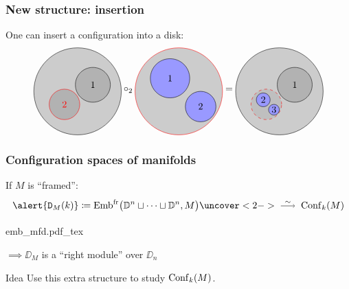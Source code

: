 \documentclass{beamer}
\newcommand{\inklude}[2]{
  \begin{center}
    \def\svgwidth{#1\linewidth} {#2.pdf_tex}
  \end{center}
}
\begin{document}
\begin{frame}
  \frametitle{New structure: insertion}
  One can insert a configuration into a disk:
    \[
      \begin{tikzpicture}[scale=0.8, baseline]
        \filldraw[fill=gray!40] (0,0) circle (2);
        \filldraw[fill=gray!60] (0.7,0.3) circle (0.8) node {$1$};
        \filldraw[red,fill=gray!60] (-0.6,-0.6) circle (0.7) node{$2$};
      \end{tikzpicture}
      \circ_{2}
      \begin{tikzpicture}[scale=0.8, baseline]
        \filldraw[red,fill=gray!40] (0,0) circle (2);
        \filldraw[fill=blue!40] (-0.4,0.6) circle (0.9) node{$1$};
        \filldraw[fill=blue!40] (1, -0.7) circle (0.7) node{$2$};
      \end{tikzpicture}
      =
      \begin{tikzpicture}[scale=0.8, baseline]
        \filldraw[fill=gray!40] (0,0) circle (2);
        \filldraw[fill=gray!60] (0.7,0.3) circle (0.8) node {$1$};
        \filldraw[dashed, red, fill=gray!50] (-0.6,-0.6) circle (0.7);
        \begin{scope}[shift = {(-0.6,-0.6)}, scale = 0.35]
          \filldraw[fill=blue!40] (-0.4,0.6) circle (0.9) node{$2$};
          \filldraw[fill=blue!40] (1, -0.7) circle (0.7) node{$3$};
        \end{scope}
      \end{tikzpicture}
    \]

 \end{frame}

 \begin{frame}
   \frametitle{Configuration spaces of manifolds}
   If $M$ is ``framed'':
   \[ \alert{\DD_{M}(k)} \coloneqq \Emb^{\mathrm{fr}} \bigl( \mathbb{D}^{n} \sqcup \dots \sqcup \mathbb{D}^{n}, M \bigr) \uncover<2->{\qiso \Conf_{k}(M) } \]

   \inklude{.8}{emb_mfd}

   \pause[3]
   \vspace{-0.7cm}
   $\implies \DD_{M}$ is a ``right module'' over $\DD_{n}$

   \begin{block}{Idea}
     Use this extra structure to study $\operatorname{Conf}_{k}(M)$.
   \end{block}
\end{frame}
\end{document}
